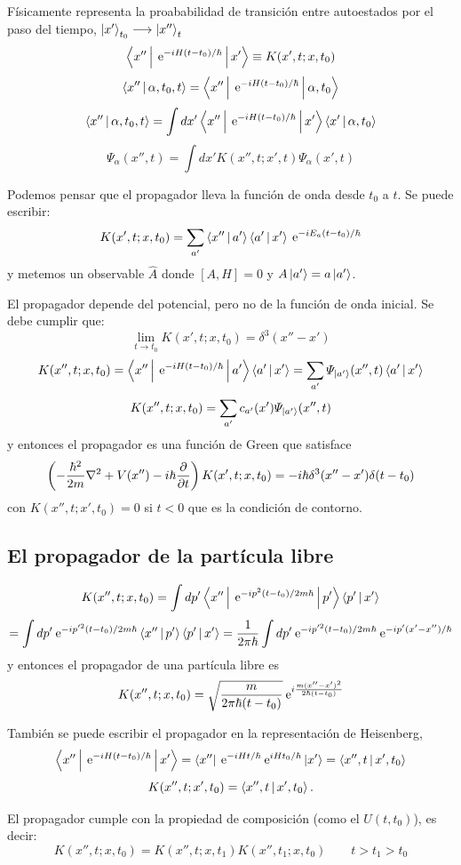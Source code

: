 \documentclass[10pt,oneside]{CBFT_book}
\begin{document}
Físicamente representa la proababilidad de transición entre autoestados por el paso del tiempo,
$ \Ket{x'}_{t_0} \longrightarrow \Ket{x''}_t$
\[
	\Braket{x''|\:\mathrm{e}^{-iH(t-t_0)/\hbar}|x'} \equiv K(x',t; x, t_0)
\]
\[
	\Braket{x''| \alpha,t_0,t} = \Braket{x''|\:\mathrm{e}^{-iH(t-t_0)/\hbar}|\alpha,t_0} 
\]
\[
	\Braket{x''| \alpha,t_0,t} = \int dx' \Braket{x''|\:\mathrm{e}^{-iH(t-t_0)/\hbar}|x'}\Braket{x'|\alpha,t_0} 
\]
\[
	\Psi_{\alpha}(x'',t) = \int dx' K(x'',t; x',t) \Psi_{\alpha}(x',t)
\]

Podemos pensar que el propagador lleva la función de onda desde $t_0$ a $t$. Se puede escribir:
\[
	K(x',t; x, t_0) = \sum_{a'} \Braket{x''|a'} \Braket{a'|x'} \:\mathrm{e}^{-iE_a(t-t_0)/\hbar}
\]
y metemos un observable $\hat{A}$ donde $[A,H]=0$ y $A\Ket{a'}=a\Ket{a'}$.

El propagador depende del potencial, pero no de la función de onda inicial. Se debe cumplir que:
\[
	\lim_{t\to t_0} K(x',t; x, t_0) = \delta^3(x''-x')
\]
\[
	K(x'',t; x, t_0) = \Braket{x''|\:\mathrm{e}^{-iH(t-t_0)/\hbar}|a'} \Braket{a'|x'} =
		\sum_{a'} \Psi_{\Ket{a'}}(x'',t)\Braket{a'|x'}
\]
\[
	K(x'',t; x, t_0) = \sum_{a'} c_{a'}(x')\Psi_{\Ket{a'}}(x'',t)
\]
y entonces el propagador es una función de Green que satisface 
\[
	\left( -\frac{\hbar^2}{2m}\nabla^2 +V(x'') - i\hbar\frac{\partial^{\hspace{-0.05em}} {}}{\partial {t}^{\hspace{-0.05em}}} \right)K(x',t; x, t_0) =
		- i\hbar \delta^3(x''-x') \delta(t-t_0)
\]
con $K(x'',t;x',t_0)=0 $ si $t<0$ que es la condición de contorno.

\subsection{El propagador de la partícula libre}

\[
	K(x'',t; x, t_0) = \int dp' \Braket{x''|\:\mathrm{e}^{-ip^2(t-t_0)/2m\hbar}|p'} \Braket{p'|x'} 
\]
\[
	= \int dp' \:\mathrm{e}^{-ip'^{2}(t-t_0)/2m\hbar} \Braket{x''|p'} \Braket{p'|x'} =
	\frac{1}{2\pi\hbar} \int dp' \:\mathrm{e}^{-ip'^{2}(t-t_0)/2m\hbar} \:\mathrm{e}^{-ip'(x'-x'')/\hbar}
\]
y entonces el propagador de una partícula libre es
\[
	K(x'',t; x, t_0) = \sqrt{ \frac{m}{2\pi\hbar(t-t_0)} } \:\mathrm{e}^{i\frac{m(x''-x')^2}{2\hbar(t-t_0)}}
\]

También se puede escribir el propagador en la representación de Heisenberg,
\[
	\Braket{x''|\:\mathrm{e}^{-iH(t-t_0)/\hbar}|x'} = \Bra{x''}\:\mathrm{e}^{-iHt/\hbar} \:\mathrm{e}^{iHt_0/\hbar}\Ket{x'}=
		\Braket{x'',t|x',t_0}
\]
\[
	K(x'',t;x',t_0) = \Braket{x'',t | x',t_0}.
\]

El propagador cumple con la propiedad de composición (como el $U(t,t_0)$), es decir:
\[
	K(x'',t; x, t_0) = K(x'',t; x, t_1)K(x'',t_1; x, t_0) \qquad t>t_1>t_0
\]
\end{document}
